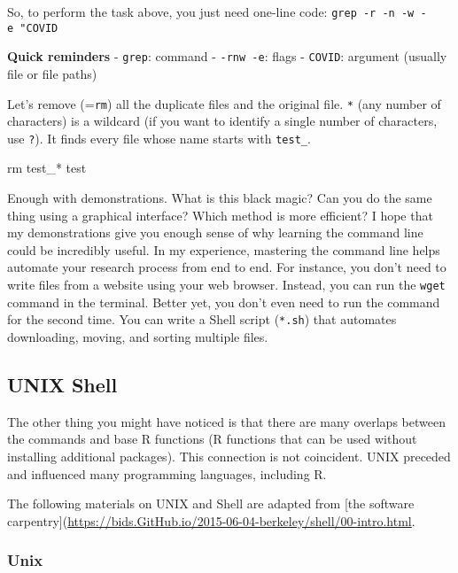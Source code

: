 \documentclass[
]{book}
\newenvironment{Shaded}{\begin{snugshade}}{\end{snugshade}}
\newcommand{\FunctionTok}[1]{\textcolor[rgb]{0.00,0.00,0.00}{#1}}
\newcommand{\NormalTok}[1]{#1}
\begin{document}
So, to perform the task above, you just need one-line code: \texttt{grep\ -r\ -n\ -w\ -e\ "COVID\textquotesingle{}\textquotesingle{}}

\textbf{Quick reminders}
- \texttt{grep}: command
- \texttt{-rnw\ -e}: flags
- \texttt{COVID}: argument (usually file or file paths)

Let's remove (=\texttt{rm}) all the duplicate files and the original file. \texttt{*} (any number of characters) is a wildcard (if you want to identify a single number of characters, use \texttt{?}). It finds every file whose name starts with \texttt{test\_}.

\begin{Shaded}
\begin{Highlighting}[]
\FunctionTok{rm}\NormalTok{ test\_* test }
\end{Highlighting}
\end{Shaded}

Enough with demonstrations. What is this black magic? Can you do the same thing using a graphical interface? Which method is more efficient? I hope that my demonstrations give you enough sense of why learning the command line could be incredibly useful. In my experience, mastering the command line helps automate your research process from end to end. For instance, you don't need to write files from a website using your web browser. Instead, you can run the \texttt{wget} command in the terminal. Better yet, you don't even need to run the command for the second time. You can write a Shell script (\texttt{*.sh}) that automates downloading, moving, and sorting multiple files.

\hypertarget{unix-shell}{%
\subsection{UNIX Shell}\label{unix-shell}}

The other thing you might have noticed is that there are many overlaps between the commands and base R functions (R functions that can be used without installing additional packages). This connection is not coincident. UNIX preceded and influenced many programming languages, including R.

The following materials on UNIX and Shell are adapted from {[}the software carpentry{]}(\url{https://bids.GitHub.io/2015-06-04-berkeley/shell/00-intro.html}.

\hypertarget{unix}{%
\subsubsection{Unix}\label{unix}}
\end{document}
